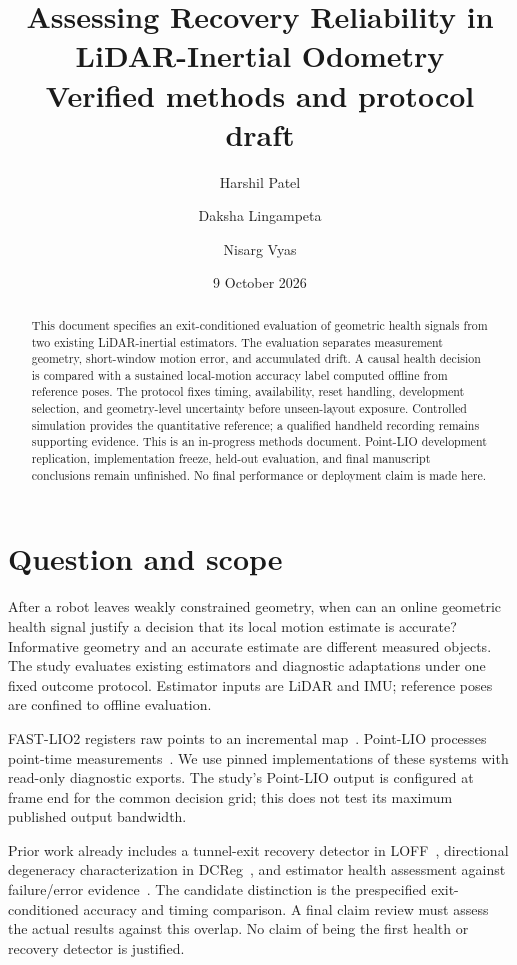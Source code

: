 \documentclass[11pt,a4paper]{article}
\title{Assessing Recovery Reliability in LiDAR-Inertial Odometry\\
\large Verified methods and protocol draft}
\author{Harshil Patel \and Daksha Lingampeta \and Nisarg Vyas}
\date{9 October 2026}
\begin{document}
\maketitle
\begin{abstract}
This document specifies an exit-conditioned evaluation of geometric health
signals from two existing LiDAR-inertial estimators. The evaluation separates
measurement geometry, short-window motion error, and accumulated drift. A
causal health decision is compared with a sustained local-motion accuracy label
computed offline from reference poses. The protocol fixes timing, availability,
reset handling, development selection, and geometry-level uncertainty before
unseen-layout exposure. Controlled simulation provides the quantitative
reference; a qualified handheld recording remains supporting evidence.
This is an in-progress methods document. Point-LIO development replication,
implementation freeze, held-out evaluation, and final manuscript conclusions
remain unfinished. No final performance or deployment claim is made here.
\end{abstract}

\section{Question and scope}
After a robot leaves weakly constrained geometry, when can an online geometric
health signal justify a decision that its local motion estimate is accurate?
Informative geometry and an accurate estimate are different measured objects.
The study evaluates existing estimators and diagnostic adaptations under one
fixed outcome protocol. Estimator inputs are LiDAR and IMU; reference poses
are confined to offline evaluation.

FAST-LIO2 registers raw points to an incremental map~\cite{fastlio}.
Point-LIO processes point-time measurements~\cite{pointlio}. We use pinned
implementations of these systems with read-only diagnostic exports. The
study's Point-LIO output is configured at frame end for the common decision
grid; this does not test its maximum published output bandwidth.

Prior work already includes a tunnel-exit recovery detector in LOFF~\cite{loff},
directional degeneracy characterization in DCReg~\cite{dcreg}, and estimator
health assessment against failure/error evidence~\cite{spectral}. The candidate
distinction is the prespecified exit-conditioned accuracy and timing
comparison. A final claim review must assess the actual results against this
overlap. No claim of being the first health or recovery detector is justified.
\end{document}
